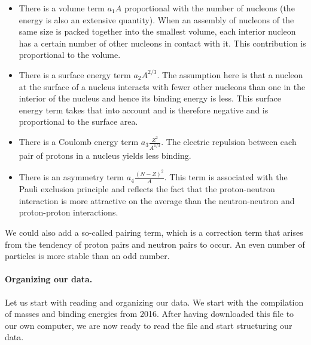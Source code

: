 \documentclass[%
oneside,                 %
final,                   %
10pt]{article}
\begin{document}
\begin{itemize}
 \item There is a volume term $a_1A$ proportional with the number of nucleons (the energy is also an extensive quantity). When an assembly of nucleons of the same size is packed together into the smallest volume, each interior nucleon has a certain number of other nucleons in contact with it. This contribution is proportional to the volume.

 \item There is a surface energy term $a_2A^{2/3}$. The assumption here is that a nucleon at the surface of a nucleus interacts with fewer other nucleons than one in the interior of the nucleus and hence its binding energy is less. This surface energy term takes that into account and is therefore negative and is proportional to the surface area.

 \item There is a Coulomb energy term $a_3\frac{Z^2}{A^{1/3}}$. The electric repulsion between each pair of protons in a nucleus yields less binding. 

 \item There is an asymmetry term $a_4\frac{(N-Z)^2}{A}$. This term is associated with the Pauli exclusion principle and reflects the fact that the proton-neutron interaction is more attractive on the average than the neutron-neutron and proton-proton interactions.
\end{itemize}

\noindent
We could also add a so-called pairing term, which is a correction term that
arises from the tendency of proton pairs and neutron pairs to
occur. An even number of particles is more stable than an odd number. 


\paragraph{Organizing our data.}
Let us start with reading and organizing our data. 
We start with the compilation of masses and binding energies from 2016.
After having downloaded this file to our own computer, we are now ready to read the file and start structuring our data.
\end{document}
